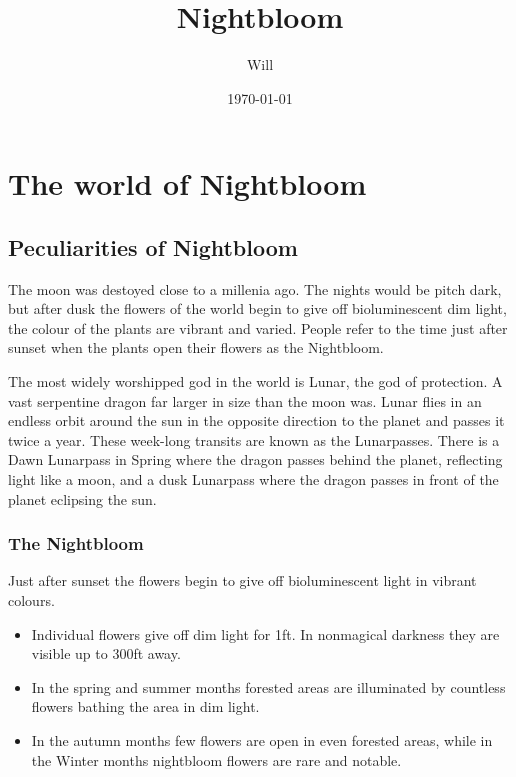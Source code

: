 \documentclass[10pt,twoside,twocolumn,openany,justified,bg=full,nomultitoc]{dndbook}
\author{Will}
\date{\today}
\title{Nightbloom}
\begin{document}
\maketitle
\tableofcontents
\chapter{The world of Nightbloom}
\label{sec-1}

\section{Peculiarities of Nightbloom}
\label{sec-1-1}
The moon was destoyed close to a millenia ago. The nights would be pitch dark, but after dusk the flowers of the world begin to give off bioluminescent dim light, the colour of the plants are vibrant and varied. People refer to the time just after sunset when the plants open their flowers as the Nightbloom. 

The most widely worshipped god in the world is Lunar, the god of protection. A vast serpentine dragon far larger in size than the moon was. Lunar flies in an endless orbit around the sun in the opposite direction to the planet and passes it twice a year. These week-long transits are known as the Lunarpasses. There is a Dawn Lunarpass in Spring where the dragon passes behind the planet, reflecting light like a moon, and a dusk Lunarpass where the dragon passes in front of the planet eclipsing the sun. 

\subsection{The Nightbloom}
\label{sec-1-1-1}
Just after sunset the flowers begin to give off bioluminescent light in vibrant colours.
\begin{itemize}
\item Individual flowers give off dim light for 1ft. In nonmagical darkness they are visible up to 300ft away.
\item In the spring and summer months forested areas are illuminated by countless flowers bathing the area in dim light.
\item In the autumn months few flowers are open in even forested areas, while in the Winter months nightbloom flowers are rare and notable.
\end{itemize}
\end{document}
